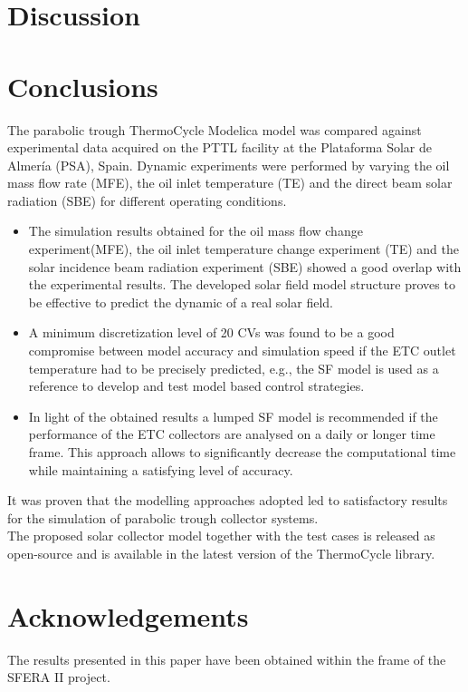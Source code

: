\documentclass[final,3p,times,review]{elsarticle}
\begin{document}
\section{Discussion}
%


%
\section{Conclusions}
%
The parabolic trough ThermoCycle Modelica model was compared against experimental data acquired on the PTTL facility at the Plataforma Solar de Almer\' ia (PSA), Spain. Dynamic experiments were performed by varying the oil mass flow rate (MFE), the oil inlet temperature (TE) and the direct beam solar radiation (SBE) for different operating conditions. 
%
\begin{itemize}
\item The simulation results obtained for the oil mass flow change experiment(MFE), the oil inlet temperature change experiment (TE) and the solar incidence beam radiation experiment (SBE) showed a good overlap with the experimental results. The developed solar field model structure proves to be effective to predict the dynamic of a real solar field.
%
%
\item A minimum discretization level of 20 CVs was found to be a good compromise between model accuracy and simulation speed if the ETC outlet temperature had to be precisely predicted, e.g., the  SF model is used as a reference to develop and test model based control strategies.
%
\item In light of the obtained results a lumped SF model is recommended if the performance of the ETC collectors are analysed on a daily or longer time frame. This approach allows to significantly decrease the computational time while maintaining a satisfying level of accuracy.
\end{itemize}
%
It was proven that the modelling approaches adopted led to satisfactory results for the simulation of parabolic trough collector systems.\\
The proposed solar collector model together with the test cases is released as open-source and is available in the latest version of the ThermoCycle library.\\
%
%
%
\section{Acknowledgements}
%
The results presented in this paper have been obtained within the frame of the SFERA II project.
%
\clearpage


\end{document}
